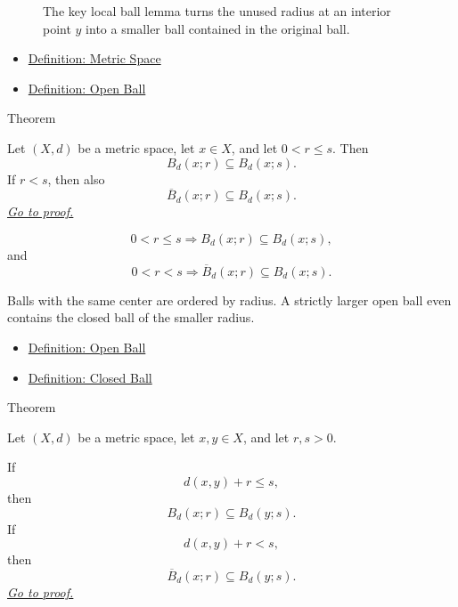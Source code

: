 \begin{figure}[htbp]
\centering

\caption{The key local ball lemma turns the unused radius at an interior
point \(y\) into a smaller ball contained in the original ball.}
\label{fig:local-ball-room}
\end{figure}

\begin{dependencies}
\begin{itemize}
  \item \hyperref[def:metric-space]{Definition: Metric Space}
  \item \hyperref[def:metric-open-ball]{Definition: Open Ball}
\end{itemize}
\end{dependencies}

\begin{theorembox}{Theorem}
\begin{theorem}\label{thm:metric-ball-nesting}
Let \((X,d)\) be a metric space, let \(x\in X\), and let \(0<r\leq s\).
Then
\[
  B_d(x;r)\subseteq B_d(x;s).
\]
If \(r<s\), then also
\[
  \overline{B}_d(x;r)\subseteq B_d(x;s).
\]
\hyperref[prf:metric-ball-nesting]{\textit{Go to proof.}}
\end{theorem}
\end{theorembox}


\begin{remark*}
\[
0<r\leq s
\Longrightarrow
B_d(x;r)\subseteq B_d(x;s),
\]
and
\[
0<r<s
\Longrightarrow
\overline{B}_d(x;r)\subseteq B_d(x;s).
\]
\end{remark*}

\begin{remark*}[Interpretation]
Balls with the same center are ordered by radius.  A strictly larger open
ball even contains the closed ball of the smaller radius.
\end{remark*}

\begin{dependencies}
\begin{itemize}
  \item \hyperref[def:metric-open-ball]{Definition: Open Ball}
  \item \hyperref[def:metric-closed-ball]{Definition: Closed Ball}
\end{itemize}
\end{dependencies}

\begin{theorembox}{Theorem}
\begin{theorem}
\label{thm:metric-ball-containment-by-center-distance}
Let \((X,d)\) be a metric space, let \(x,y\in X\), and let \(r,s>0\).

If
\[
  d(x,y)+r\leq s,
\]
then
\[
  B_d(x;r)\subseteq B_d(y;s).
\]
If
\[
  d(x,y)+r<s,
\]
then
\[
  \overline{B}_d(x;r)\subseteq B_d(y;s).
\]
\hyperref[prf:metric-ball-containment-by-center-distance]{\textit{Go to proof.}}
\end{theorem}
\end{theorembox}

